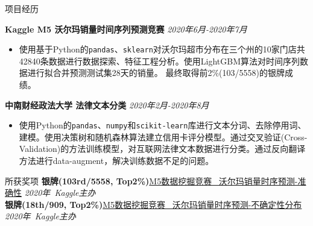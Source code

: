 \documentclass{resume} %
\begin{document}
\begin{rSection}{\noindent 项目经历}
\begin{spacing}{0.1}  
{\bf Kaggle M5 沃尔玛销量时间序列预测竞赛} \hfill {\em 2020年6月-2020年7月 \quad } 
\begin{itemize}
\item 使用基于Python的\texttt{pandas}、\texttt{sklearn}对沃尔玛超市分布在三个州的10家门店共 42840条数据进行数据探索、特征工程分析。使用LightGBM算法对时间序列数据进行拟合并预测测试集28天的销量。 最终取得前2\%(103/5558)的银牌成绩。 \
\end{itemize}
{\bf 中南财经政法大学 \quad 法律文本分类} \hfill{\em 2020年2月-2020年8月} 
\begin{itemize}
\item 使用Python的\texttt{pandas}、\texttt{numpy}和\texttt{scikit-learn}库进行文本分词、去除停用词、建模。使用决策树和随机森林算法建立信用卡评分模型。通过交叉验证(Cross-Validation)的方法训练模型，对互联网法律文本数据进行分类。通过反向翻译方法进行data-augment，解决训练数据不足的问题。
\end{itemize}

\end{spacing}
\end{rSection}

\begin{rSection}{\noindent 所获奖项}
{\bf 银牌(103rd/5558, Top2\%)}\qquad \href{https://www.kaggle.com/c/m5-forecasting-accuracy}{M5数据挖掘竞赛 \ 沃尔玛销量时序预测-准确性} \hfill{\em 2020年\ Kaggle主办} \\  
{\bf 银牌(18th/909, Top2\%)}\qquad \href{https://www.kaggle.com/c/m5-forecasting-uncertainty}{M5数据挖掘竞赛 \ 沃尔玛销量时序预测-不确定性分布} \hfill{\em 2020年\ Kaggle主办} \\  

\end{rSection}
\end{document}
